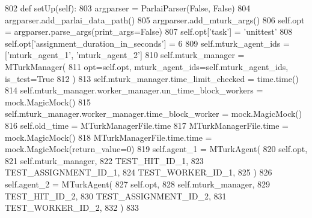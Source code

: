 \begin{DoxyCode}
802     \textcolor{keyword}{def }setUp(self):
803         argparser = ParlaiParser(\textcolor{keyword}{False}, \textcolor{keyword}{False})
804         argparser.add\_parlai\_data\_path()
805         argparser.add\_mturk\_args()
806         self.opt = argparser.parse\_args(print\_args=\textcolor{keyword}{False})
807         self.opt[\textcolor{stringliteral}{'task'}] = \textcolor{stringliteral}{'unittest'}
808         self.opt[\textcolor{stringliteral}{'assignment\_duration\_in\_seconds'}] = 6
809         self.mturk\_agent\_ids = [\textcolor{stringliteral}{'mturk\_agent\_1'}, \textcolor{stringliteral}{'mturk\_agent\_2'}]
810         self.mturk\_manager = MTurkManager(
811             opt=self.opt, mturk\_agent\_ids=self.mturk\_agent\_ids, is\_test=\textcolor{keyword}{True}
812         )
813         self.mturk\_manager.time\_limit\_checked = time.time()
814         self.mturk\_manager.worker\_manager.un\_time\_block\_workers = mock.MagicMock()
815         self.mturk\_manager.worker\_manager.time\_block\_worker = mock.MagicMock()
816         self.old\_time = MTurkManagerFile.time
817         MTurkManagerFile.time = mock.MagicMock()
818         MTurkManagerFile.time.time = mock.MagicMock(return\_value=0)
819         self.agent\_1 = MTurkAgent(
820             self.opt,
821             self.mturk\_manager,
822             TEST\_HIT\_ID\_1,
823             TEST\_ASSIGNMENT\_ID\_1,
824             TEST\_WORKER\_ID\_1,
825         )
826         self.agent\_2 = MTurkAgent(
827             self.opt,
828             self.mturk\_manager,
829             TEST\_HIT\_ID\_2,
830             TEST\_ASSIGNMENT\_ID\_2,
831             TEST\_WORKER\_ID\_2,
832         )
833 
\end{DoxyCode}
\mbox{\label{classparlai_1_1mturk_1_1core_1_1dev_1_1test_1_1test__mturk__manager_1_1TestMTurkManagerTimeHandling_a860fa695bf89879c9c04293b657005e5}} 

